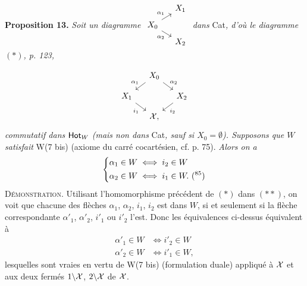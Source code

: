 \textbf{Proposition 13.} \textit{Soit un diagramme} $\begin{tikzcd}[column sep=small, row sep=tiny, ampersand replacement=\&, baseline=(\tikzcdmatrixname-2-1.base)]
 \& X_1 \\
X_0 \arrow[ur, "\alpha_1"] \arrow[dr, "\alpha_2"'] \& \\
 \& X_2
\end{tikzcd}$ \textit{dans} Cat\textit{, d'où le diagramme} $(*)$\textit{, p. 123,}

\[
\begin{tikzcd}[column sep=small, row sep=small, ampersand replacement=\&]
 \& X_0 \arrow[dl, "\alpha_1"'] \arrow[dr, "\alpha_2"] \& \\
X_1 \arrow[dr, "i_1"'] \& \& X_2 \arrow[dl, "i_2"] \\
 \& \cX, \&
\end{tikzcd}
\]
\textit{commutatif dans} $\mathsf{Hot}_W$ \textit{(mais non dans} Cat\textit{, sauf si $X_0 = \emptyset$). Supposons que $W$ satisfait} W(7 bis) (axiome du carré cocartésien, cf. p. 75). \textit{Alors on a}
\[
\left\{
\begin{aligned}
\alpha_1\in W &\iff i_2\in W\\
\alpha_2\in W &\iff i_1\in W. \text{ (\footnotemark[85])}
\end{aligned}
\right.
\]
\textsc{Démonstration}. Utilisant l'homomorphisme précédent de $(*)$ dans $(**)$, on voit que chacune des flèches $\alpha_1$, $\alpha_2$, $i_1$, $i_2$ est dans $W$, si et seulement si la flèche correspondante $\alpha'_1$, $\alpha'_2$, $i'_1$ ou $i'_2$ l'est. Donc les équivalences ci-dessus équivalent à
\[
\begin{aligned}
\alpha'_1\in W &\iff i'_2\in W\\
\alpha'_2\in W &\iff i'_1\in W,
\end{aligned}
\]
lesquelles sont vraies en vertu de W(7 bis) (formulation duale) appliqué à $\mathcal{X}$ et aux deux fermés $1\backslash\mathcal{X}$, $2\backslash\mathcal{X}$ de $\mathcal{X}$.

